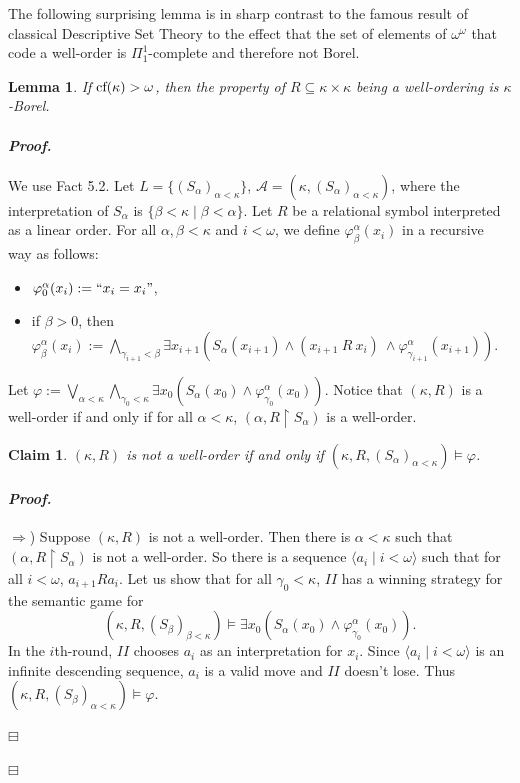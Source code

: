\documentclass[12pt,a4paper]{amsart}
\newtheorem{lemma}[thm]{Lemma}
\newtheorem{claim}{Claim}[thm]
\theoremstyle{definition}
\theoremstyle{remark}
\renewcommand{\mid}{\mathrel{|}\allowbreak}
\renewcommand{\restriction}{\mathbin\upharpoonright}
\newenvironment{cproof}{\paragraph{\emph{Proof.\,}}}{\hfill{$\boxminus$}\par\vspace{2mm}}
\begin{document}
The following surprising lemma is in sharp contrast to the famous result of classical Descriptive Set Theory to the effect that the set of elements of $\omega^\omega$ that code a well-order is $\Pi^1_1$-complete and therefore not Borel.
\begin{lemma}
    If $\mbox{\rm cf}(\kappa)>\omega$, then the property of $R\subseteq \kappa\times\kappa$ being a well-ordering is $\kappa$-Borel.
\end{lemma}
\begin{cproof} We use Fact 5.2.
    Let $L=\{(S_\alpha)_{\alpha<\kappa}\}$, $\mathcal{A}=(\kappa,(S_\alpha)_{\alpha<\kappa})$, where the interpretation of $S_\alpha$ is $\{\beta<\kappa\mid \beta<\alpha\}$. Let $R$ be a relational symbol interpreted as a linear order. For all $\alpha,\beta<\kappa$ and $i<\omega$, we define $\varphi^\alpha_\beta(x_i)$ in a recursive way as follows:
    \begin{itemize}
        \item $\varphi^\alpha_0(x_i):= ``x_i=x_i"$,
        \item if $\beta>0$, then $\varphi^\alpha_\beta(x_i):=\bigwedge_{\gamma_{i+1}<\beta}\exists x_{i+1}(S_\alpha(x_{i+1})\wedge (x_{i+1}\ R\ x_i)\ \wedge\varphi^\alpha_{\gamma_{i+1}}(x_{i+1}))$.
    \end{itemize}
    Let $\varphi:=\bigvee_{\alpha<\kappa}\bigwedge_{\gamma_0<\kappa}\exists x_0(S_\alpha(x_0)\wedge \varphi^\alpha_{\gamma_0}(x_0))$.
    Notice that $(\kappa,R)$ is a well-order if and only if for all $\alpha<\kappa$, $(\alpha,R\restriction S_\alpha)$ is a well-order.
    \begin{claim}
        $(\kappa,R)$ is not a well-order if and only if $(\kappa,R,(S_\alpha)_{\alpha<\kappa})\models \varphi$.
    \end{claim}
    \begin{cproof}
        $\Rightarrow$) Suppose $(\kappa,R)$ is not a well-order. Then there is $\alpha<\kappa$ such that $(\alpha,R\restriction S_\alpha)$ is not a well-order. So there is a sequence $\langle a_i\mid i<\omega\rangle$ such that for all $i<\omega$, $a_{i+1}Ra_i$. Let us show that for all $\gamma_0<\kappa$, $II$ has a winning strategy for the  semantic game for $$(\kappa,R,(S_\beta)_{\beta<\kappa})\models \exists x_0(S_\alpha(x_0)\wedge \varphi^\alpha_{\gamma_0}(x_0)).$$ 
        In the $i$th-round, $II$ chooses $a_i$ as an interpretation for $x_i$. Since $\langle a_i\mid i<\omega\rangle$ is an infinite descending sequence, $a_i$ is a valid move and $II$ doesn't lose. Thus $(\kappa,R,(S_\beta)_{\alpha<\kappa})\models \varphi$.


\end{cproof}
\end{cproof}
\end{document}
